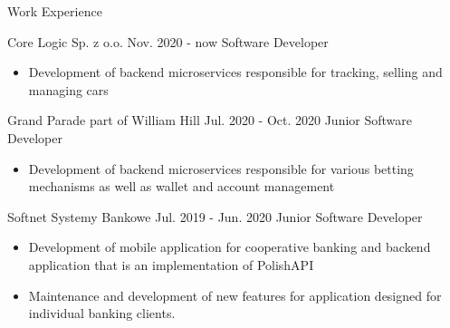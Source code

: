 \documentclass{resume} %
\begin{document}
    \begin{rSection}
    {Work Experience}
        \begin{rSubsection}
        {Core Logic Sp. z o.o.}
        {Nov. 2020 - now}
        {Software Developer}

            \begin{itemize}


                \item{Development of backend microservices responsible for tracking, selling and managing cars}

            \end{itemize}

        \end{rSubsection}

        \begin{rSubsection}
        {Grand Parade part of William Hill}
        {Jul. 2020 - Oct. 2020}
        {Junior Software Developer}

            \begin{itemize}

                \item{Development of backend microservices responsible for various betting mechanisms as well as wallet and account management}

            \end{itemize}
        \end{rSubsection}

        \begin{rSubsection}
        {Softnet Systemy Bankowe}
        {Jul. 2019 - Jun. 2020}
        {Junior Software Developer}

            \begin{itemize}

                \item{Development of mobile application for cooperative banking and backend application that is an implementation of PolishAPI}

                \item{Maintenance and development of new features for application designed for individual banking clients.}

            \end{itemize}
        \end{rSubsection}

    \end{rSection}

\end{document}
